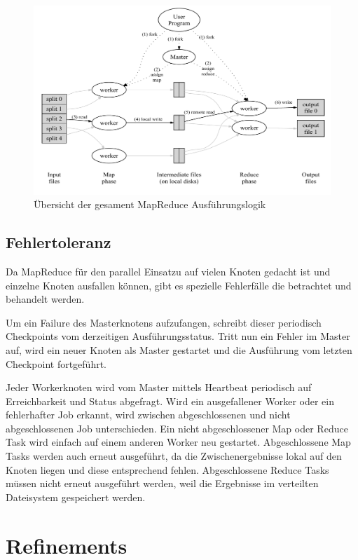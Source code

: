 \begin{figure}[H]
	\includegraphics[width=\textwidth]{pics/mapReduce/mapreduce-osdi04e}
	\caption{Übersicht der gesament MapReduce Ausführungslogik}
\end{figure}


\subsection*{Fehlertoleranz}

Da MapReduce für den parallel Einsatzu auf vielen Knoten gedacht ist und einzelne Knoten ausfallen können, gibt es spezielle Fehlerfälle die betrachtet und behandelt werden.

Um ein Failure des Masterknotens aufzufangen, schreibt dieser periodisch Checkpoints vom derzeitigen Ausführungsstatus.
Tritt nun ein Fehler im Master auf, wird ein neuer Knoten als Master gestartet und die Ausführung vom letzten Checkpoint fortgeführt.

Jeder Workerknoten wird vom Master mittels Heartbeat periodisch auf Erreichbarkeit und Status abgefragt.
Wird ein ausgefallener Worker oder ein fehlerhafter Job erkannt, wird zwischen abgeschlossenen und nicht abgeschlossenen Job unterschieden.
Ein nicht abgeschlossener Map oder Reduce Task wird einfach auf einem anderen Worker neu gestartet.
Abgeschlossene Map Tasks werden auch erneut ausgeführt, da die Zwischenergebnisse lokal auf den Knoten liegen und diese entsprechend fehlen.
Abgeschlossene Reduce Tasks müssen nicht erneut ausgeführt werden, weil die Ergebnisse im verteilten Dateisystem gespeichert werden.


\section{Refinements}

